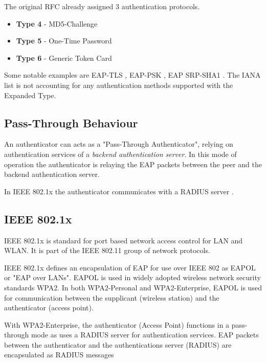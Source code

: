 The original RFC \cite{aboba2004extensible} already assigned 3 authentication protocols.

\begin{itemize}
	\item \textbf{Type 4} - MD5-Challenge
	\item \textbf{Type 5} - One-Time Password
	\item \textbf{Type 6} - Generic Token Card
\end{itemize}

Some notable examples are EAP-TLS \cite{simon2008eap}, EAP-PSK \cite{bersani2007eap}, EAP SRP-SHA1 \cite{carlson135eap}.
The IANA list is not accounting for any authentication methods supported with the Expanded Type.


\subsection{Pass-Through Behaviour}
An authenticator can acts as a "Pass-Through Authenticator", relying on authentication services of a \textit{backend authentication server}. 
In this mode of operation the authenticator is relaying the EAP packets between the peer and the backend authentication server.

In IEEE 802.1x the authenticator communicates with a RADIUS server \cite{congdon2003ieee}.

\subsection{IEEE 802.1x}

IEEE 802.1x is standard for port based network access control for LAN and WLAN. It is part of the IEEE 802.11 group of network protocols.

IEEE 802.1x defines an encapsulation of EAP for use over IEEE 802 as EAPOL or "EAP over LANs".
EAPOL is used in widely adopted wireless network security standards WPA2. In both WPA2-Personal and WPA2-Enterprise, EAPOL is used for communication between the supplicant (wireless station) and the authenticator (access point).

With WPA2-Enterprise, the authenticator (Access Point) functions in a pass-through mode as uses a RADIUS server for authentication services. 
EAP packets between the authenticator and the authentications server (RADIUS) are encapsulated as RADIUS messages \cite{aboba2003radius, chen2005extensible, congdon2003ieee}